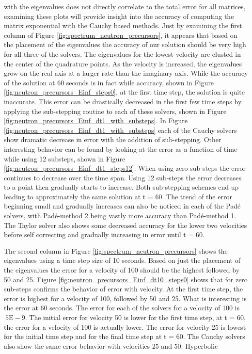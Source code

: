 \noindent with the eigenvalues does not directly correlate to the total error for all matrices, examining these plots will provide insight into the accuracy of computing the matrix exponential with the Cauchy based methods. Just by examining the first column of Figure \ref{fig:spectrum_neutron_precursors}, it appears that based on the placement of the eigenvalues the accuracy of our solution should be very high for all three of the solvers. The eigenvalues for the lowest velocity are clusted in the center of the quadrature points. As the velocity is increased, the eigenvalues grow on the real axis at a larger rate than the imaginary axis. While the accuracy of the solution at 60 seconds is in fact while accuracy, shown in Figure \ref{fig:neutron_precursors_Einf_steps0}, at the first time step, the solution is quite inaccurate. This error can be drastically decreased in the first few time steps by applying the sub-stepping routine to each of these solvers, shown in Figure \ref{fig:neutron_precursors_Einf_dt1_with_substeps}. In Figure \ref{fig:neutron_precursors_Einf_dt1_with_substeps} each of the Cauchy solvers show dramatic decrease in error with the addition of sub-stepping. Other interesting behavior can be found by looking at the error as a function of time while using 12 substeps, shown in Figure \ref{fig:neutron_precursors_Einf_dt1_steps12}. When using zero sub-steps the error continues to decrease over the time span. Using 12 sub-steps the error decreases to a point then gradually starts to increase. Both sub-stepping schemes end up leading to approximately the same solution at t = 60. The trend of the error beginning small and gradually increases can also be noticed in each of the Pad\'e solvers, with Pad\'e-method 2 being vastly more accuracy than Pad\'e-method 1. The Taylor solver also shows some decreased accuracy for the lower two velocities before self correcting and gradually increasing in error until t = 60. 

The second column in Figure \ref{fig:spectrum_neutron_precursors} shows the eigenvalues using a time step size of 10 seconds. Based on just the placement of the eigenvalues the error for a velocity of 100 should be the highest followed by 50 and 25. Figure \ref{fig:neutron_precursors_Einf_dt10_steps0} shows that for zero sub-steps confirms the behavior of error with velocity. At the first time step, the error is highest for a velocity of 100, followed by 50 and 25. What is interesting is the error at 60 seconds. The error for each of the solvers for a velocity of 100 is $~5\text{E}-9$. The initial error for velocity 50 is lower for the first time step, at t = 60, the error for a velocity of 100 is actually lower. The error for velocity 25 is lowest for the initial time step and for the final time step at t = 60. The Cauchy solvers also show the same error behavior with velocities 25 and 50. Hyperbolic 

